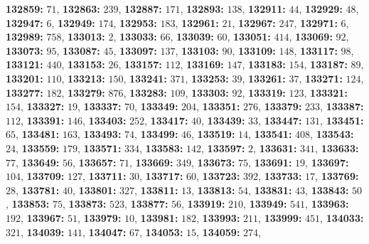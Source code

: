 \textsf{\bfseries 132859:} $71$, \textsf{\bfseries 132863:} $239$, \textsf{\bfseries 132887:} $171$, \textsf{\bfseries 132893:} $138$, \textsf{\bfseries 132911:} $44$, \textsf{\bfseries 132929:} $48$, \textsf{\bfseries 132947:} $6$, \textsf{\bfseries 132949:} $174$, \textsf{\bfseries 132953:} $183$, \textsf{\bfseries 132961:} $21$, \textsf{\bfseries 132967:} $247$, \textsf{\bfseries 132971:} $6$, \textsf{\bfseries 132989:} $758$, \textsf{\bfseries 133013:} $2$, \textsf{\bfseries 133033:} $66$, \textsf{\bfseries 133039:} $60$, \textsf{\bfseries 133051:} $414$, \textsf{\bfseries 133069:} $92$, \textsf{\bfseries 133073:} $95$, \textsf{\bfseries 133087:} $45$, \textsf{\bfseries 133097:} $137$, \textsf{\bfseries 133103:} $90$, \textsf{\bfseries 133109:} $148$, \textsf{\bfseries 133117:} $98$, \textsf{\bfseries 133121:} $440$, \textsf{\bfseries 133153:} $26$, \textsf{\bfseries 133157:} $112$, \textsf{\bfseries 133169:} $147$, \textsf{\bfseries 133183:} $154$, \textsf{\bfseries 133187:} $89$, \textsf{\bfseries 133201:} $110$, \textsf{\bfseries 133213:} $150$, \textsf{\bfseries 133241:} $371$, \textsf{\bfseries 133253:} $39$, \textsf{\bfseries 133261:} $37$, \textsf{\bfseries 133271:} $124$, \textsf{\bfseries 133277:} $182$, \textsf{\bfseries 133279:} $876$, \textsf{\bfseries 133283:} $109$, \textsf{\bfseries 133303:} $92$, \textsf{\bfseries 133319:} $123$, \textsf{\bfseries 133321:} $154$, \textsf{\bfseries 133327:} $19$, \textsf{\bfseries 133337:} $70$, \textsf{\bfseries 133349:} $204$, \textsf{\bfseries 133351:} $276$, \textsf{\bfseries 133379:} $233$, \textsf{\bfseries 133387:} $112$, \textsf{\bfseries 133391:} $146$, \textsf{\bfseries 133403:} $252$, \textsf{\bfseries 133417:} $40$, \textsf{\bfseries 133439:} $33$, \textsf{\bfseries 133447:} $131$, \textsf{\bfseries 133451:} $65$, \textsf{\bfseries 133481:} $163$, \textsf{\bfseries 133493:} $74$, \textsf{\bfseries 133499:} $46$, \textsf{\bfseries 133519:} $14$, \textsf{\bfseries 133541:} $408$, \textsf{\bfseries 133543:} $24$, \textsf{\bfseries 133559:} $179$, \textsf{\bfseries 133571:} $334$, \textsf{\bfseries 133583:} $142$, \textsf{\bfseries 133597:} $2$, \textsf{\bfseries 133631:} $341$, \textsf{\bfseries 133633:} $77$, \textsf{\bfseries 133649:} $56$, \textsf{\bfseries 133657:} $71$, \textsf{\bfseries 133669:} $349$, \textsf{\bfseries 133673:} $75$, \textsf{\bfseries 133691:} $19$, \textsf{\bfseries 133697:} $104$, \textsf{\bfseries 133709:} $127$, \textsf{\bfseries 133711:} $30$, \textsf{\bfseries 133717:} $60$, \textsf{\bfseries 133723:} $392$, \textsf{\bfseries 133733:} $17$, \textsf{\bfseries 133769:} $28$, \textsf{\bfseries 133781:} $40$, \textsf{\bfseries 133801:} $327$, \textsf{\bfseries 133811:} $13$, \textsf{\bfseries 133813:} $54$, \textsf{\bfseries 133831:} $43$, \textsf{\bfseries 133843:} $50$, \textsf{\bfseries 133853:} $75$, \textsf{\bfseries 133873:} $523$, \textsf{\bfseries 133877:} $56$, \textsf{\bfseries 133919:} $210$, \textsf{\bfseries 133949:} $541$, \textsf{\bfseries 133963:} $192$, \textsf{\bfseries 133967:} $51$, \textsf{\bfseries 133979:} $10$, \textsf{\bfseries 133981:} $182$, \textsf{\bfseries 133993:} $211$, \textsf{\bfseries 133999:} $451$, \textsf{\bfseries 134033:} $321$, \textsf{\bfseries 134039:} $141$, \textsf{\bfseries 134047:} $67$, \textsf{\bfseries 134053:} $15$, \textsf{\bfseries 134059:} $274$, 
